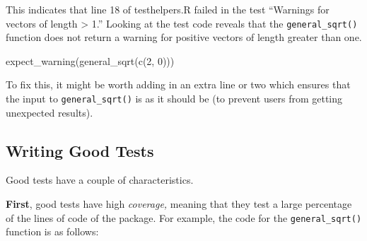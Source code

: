 \documentclass[
]{book}
\newenvironment{Shaded}{\begin{snugshade}}{\end{snugshade}}
\newcommand{\DecValTok}[1]{\textcolor[rgb]{0.00,0.00,0.81}{#1}}
\newcommand{\FunctionTok}[1]{\textcolor[rgb]{0.00,0.00,0.00}{#1}}
\newcommand{\NormalTok}[1]{#1}
\begin{document}
This indicates that line 18 of testhelpers.R failed in the test ``Warnings for vectors of length \textgreater{} 1.'' Looking at the test code reveals that the \texttt{general\_sqrt()} function does not return a warning for positive vectors of length greater than one.

\begin{Shaded}
\begin{Highlighting}[]
\FunctionTok{expect\_warning}\NormalTok{(}\FunctionTok{general\_sqrt}\NormalTok{(}\FunctionTok{c}\NormalTok{(}\DecValTok{2}\NormalTok{, }\DecValTok{0}\NormalTok{)))}
\end{Highlighting}
\end{Shaded}

To fix this, it might be worth adding in an extra line or two which ensures that the input to \texttt{general\_sqrt()} is as it should be (to prevent users from getting unexpected results).

\hypertarget{writing-good-tests}{%
\subsection{Writing Good Tests}\label{writing-good-tests}}

Good tests have a couple of characteristics.

\textbf{First}, good tests have high \emph{coverage,} meaning that they test a large percentage of the lines of code of the package. For example, the code for the \texttt{general\_sqrt()} function is as follows:
\end{document}
